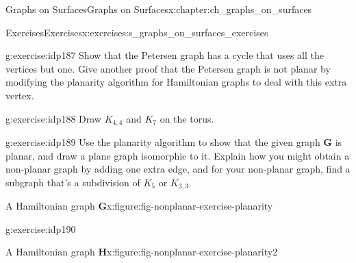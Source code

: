 \documentclass[oneside,10pt,]{book}
\numberwithin{equation}{section}
\newcommand{\bfG}{\mathbf{G}}
\newcommand{\bfH}{\mathbf{H}}
\begin{document}
\begin{chapterptx}{Graphs on Surfaces}{}{Graphs on Surfaces}{}{}{x:chapter:ch_graphs_on_surfaces}
\typeout{************************************************}
%
\begin{exercises-section}{Exercises}{}{Exercises}{}{}{x:exercises:s_graphs_on_surfaces_exercises}
\begin{divisionexercise}{1}{}{}{g:exercise:idp187}%
Show that the Petersen graph has a cycle that uses all the vertices but one.  Give another proof that the Petersen graph is not planar by modifying the planarity algorithm for Hamiltonian graphs to deal with this extra vertex.\end{divisionexercise}%
\begin{divisionexercise}{2}{}{}{g:exercise:idp188}%
Draw \(K_{4,4}\) and \(K_7\) on the torus.\end{divisionexercise}%
\begin{divisionexercise}{3}{}{}{g:exercise:idp189}%
Use the planarity algorithm to show that the given graph \(\bfG\) is planar, and draw a plane graph isomorphic to it.  Explain how you might obtain a non-planar graph by adding one extra edge, and for your non-planar graph, find a subgraph that's a subdivision of \(K_5\) or \(K_{3,3}\). \begin{figureptx}{A Hamiltonian graph \(\bfG\)}{x:figure:fig-nonplanar-exercise-planarity}{}%
\begin{image}{0.15}{0.7}{0.15}%
%
\end{image}%
\tcblower
\end{figureptx}%
\end{divisionexercise}%
\begin{divisionexercise}{4}{}{}{g:exercise:idp190}%
\begin{figureptx}{A Hamiltonian graph \(\bfH\)}{x:figure:fig-nonplanar-exercise-planarity2}{}%
\begin{image}{0.15}{0.7}{0.15}%
\end{image}
\end{figureptx}
\end{divisionexercise}
\end{exercises-section}
\end{chapterptx}
\end{document}
